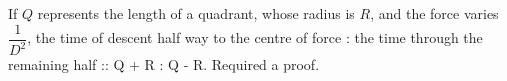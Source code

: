 If $Q$ represents the length of a quadrant, whose radius 
is $R$, and the force varies $\dfrac{1}{D^2}$, the time
of descent half way to the centre of force : the time
through the remaining half :: Q + R : Q - R.
Required a proof.
